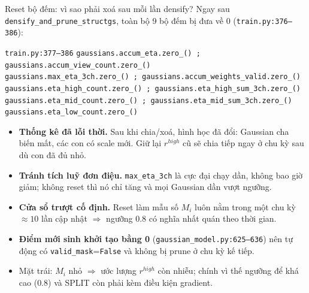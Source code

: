 \begin{frame}[fragile]{Reset bộ đếm: vì sao phải xoá sau mỗi lần densify?}
\footnotesize
Ngay sau \texttt{densify\_and\_prune\_structgs}, toàn bộ 9 bộ đếm bị đưa về 0 (\texttt{train.py:376--386}):
\begin{block}{\scriptsize \texttt{train.py:377--386}}
\scriptsize
\texttt{gaussians.accum\_eta.zero\_() ; gaussians.accum\_view\_count.zero\_()} \\
\texttt{gaussians.max\_eta\_3ch.zero\_() ; gaussians.accum\_weights\_valid.zero\_()} \\
\texttt{gaussians.eta\_high\_count.zero\_() ; gaussians.eta\_high\_sum\_3ch.zero\_()} \\
\texttt{gaussians.eta\_mid\_count.zero\_() ; gaussians.eta\_mid\_sum\_3ch.zero\_()} \\
\texttt{gaussians.eta\_low\_count.zero\_()}
\end{block}
\begin{itemize}\itemsep1pt
  \item \textbf{Thống kê đã lỗi thời.} Sau khi chia/xoá, hình học đã đổi: Gaussian cha biến mất, các con có scale mới. Giữ lại $r^{high}$ cũ sẽ chia tiếp ngay ở chu kỳ sau dù con đã đủ nhỏ.
  \item \textbf{Tránh tích luỹ đơn điệu.} \texttt{max\_eta\_3ch} là cực đại chạy dần, không bao giờ giảm; không reset thì nó chỉ tăng và mọi Gaussian dần vượt ngưỡng.
  \item \textbf{Cửa sổ trượt cố định.} Reset làm mẫu số $M_i$ luôn nằm trong một chu kỳ $\approx 10$ lần cập nhật $\Rightarrow$ ngưỡng $0.8$ có nghĩa nhất quán theo thời gian.
  \item \textbf{Điểm mới sinh khởi tạo bằng 0} (\texttt{gaussian\_model.py:625--636}) nên tự động có \texttt{valid\_mask}=\texttt{False} và không bị prune ở chu kỳ kế tiếp.
  \item Mặt trái: $M_i$ nhỏ $\Rightarrow$ ước lượng $r^{high}$ còn nhiễu; chính vì thế ngưỡng để khá cao ($0.8$) và SPLIT còn phải kèm điều kiện gradient.
\end{itemize}
\end{frame}


